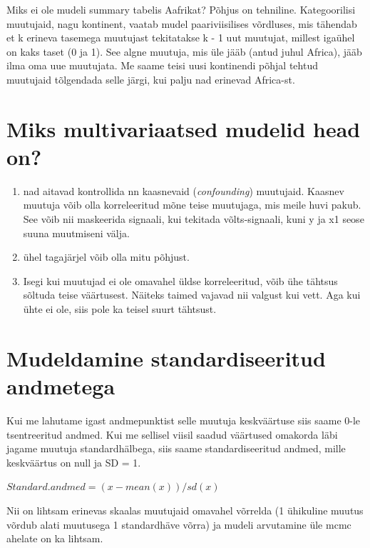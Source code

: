 \documentclass[]{book}
\begin{document}
Miks ei ole mudeli summary tabelis Aafrikat? Põhjus on tehniline.
Kategoorilisi muutujaid, nagu kontinent, vaatab mudel paariviisilises
võrdluses, mis tähendab et k erineva tasemega muutujast tekitatakse k -
1 uut muutujat, millest igaühel on kaks taset (0 ja 1). See algne
muutuja, mis üle jääb (antud juhul Africa), jääb ilma oma uue muutujata.
Me saame teisi uusi kontinendi põhjal tehtud muutujaid tõlgendada selle
järgi, kui palju nad erinevad Africa-st.

\section*{Miks multivariaatsed mudelid head
on?}\label{miks-multivariaatsed-mudelid-head-on}

\begin{enumerate}
\def\labelenumi{\arabic{enumi})}
\item
  nad aitavad kontrollida nn kaasnevaid (\emph{confounding}) muutujaid.
  Kaasnev muutuja võib olla korreleeritud mõne teise muutujaga, mis
  meile huvi pakub. See võib nii maskeerida signaali, kui tekitada
  võlts-signaali, kuni y ja x1 seose suuna muutmiseni välja.
\item
  ühel tagajärjel võib olla mitu põhjust.
\item
  Isegi kui muutujad ei ole omavahel üldse korreleeritud, võib ühe
  tähtsus sõltuda teise väärtusest. Näiteks taimed vajavad nii valgust
  kui vett. Aga kui ühte ei ole, siis pole ka teisel suurt tähtsust.
\end{enumerate}

\section*{Mudeldamine standardiseeritud
andmetega}\label{mudeldamine-standardiseeritud-andmetega}

Kui me lahutame igast andmepunktist selle muutuja keskväärtuse siis
saame 0-le tsentreeritud andmed. Kui me sellisel viisil saadud väärtused
omakorda läbi jagame muutuja standardhälbega, siis saame
standardiseeritud andmed, mille keskväärtus on null ja SD = 1.

\(Standard.andmed = (x - mean(x))/sd(x)\)

Nii on lihtsam erinevas skaalas muutujaid omavahel võrrelda (1 ühikuline
muutus võrdub alati muutusega 1 standardhäve võrra) ja mudeli arvutamine
üle mcmc ahelate on ka lihtsam.
\end{document}
